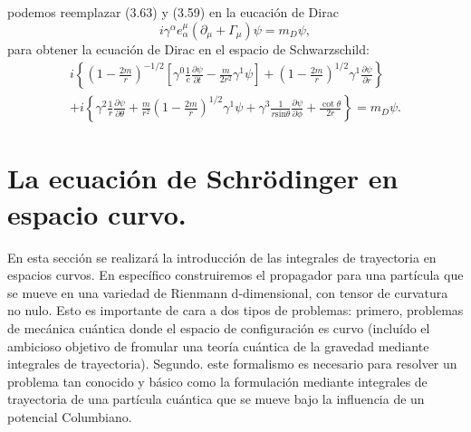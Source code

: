 podemos reemplazar (3.63) y (3.59) en la eucación de Dirac
\begin{equation}
i\gamma^{\alpha}e_{\alpha}^{\mu}(\partial_{\mu}+\Gamma_{\mu})\psi=m_{D}\psi ,
\end{equation}
para obtener la ecuación de Dirac en el espacio de Schwarzschild:
\begin{eqnarray}
\nonumber i\left\{ \left(1-\frac{2m}{r}\right)^{-1/2}\left[\gamma^{0}\frac{1}{c}\frac{\partial\psi}{\partial t}-\frac{m}{2r^{2}}\gamma^{1}\psi\right]+\left(1-\frac{2m}{r}\right)^{1/2}\gamma^{1}\frac{\partial\psi}{\partial r}\right\}\\
+i\left\{ \gamma^{2}\frac{1}{r}\frac{\partial\psi}{\partial\theta}+\frac{m}{r^{2}}\left(1-\frac{2m}{r}\right)^{1/2}\gamma^{1}\psi+\gamma^{3}\frac{1}{r\text{sin}\theta}\frac{\partial\psi}{\partial\phi}+\frac{\cot\theta}{2r}\right\} =m_{D}\psi .
\end{eqnarray}
\newpage





\section{La ecuación de Schrödinger en espacio curvo.}
En esta sección se realizará la introducción de las integrales de trayectoria en espacios curvos. En específico construiremos el propagador para una partícula que se mueve en una variedad de Rienmann d-dimensional, con tensor de curvatura no nulo. Esto es importante de cara a dos tipos de problemas: primero, problemas de mecánica cuántica donde el espacio de configuración es curvo (incluído el ambicioso objetivo de fromular una teoría cuántica de la gravedad mediante integrales de trayectoria). Segundo. este formalismo es necesario para resolver un problema tan conocido y básico como la formulación mediante integrales de trayectoria de una partícula cuántica que se mueve bajo la influencia de un potencial Columbiano.



